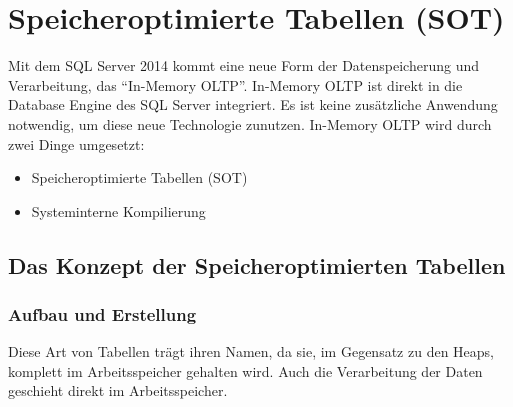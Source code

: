    \section{Speicheroptimierte Tabellen (SOT)}
      Mit dem SQL Server 2014 kommt eine neue Form der Datenspeicherung und
      Verarbeitung, das \enquote{In-Memory OLTP}. In-Memory OLTP ist direkt
      in die Database Engine des SQL Server integriert. Es ist keine
      zusätzliche Anwendung notwendig, um diese neue Technologie zunutzen.
      In-Memory OLTP wird durch zwei Dinge umgesetzt:
      \begin{itemize}
        \item Speicheroptimierte Tabellen (SOT)
        \item Systeminterne Kompilierung
      \end{itemize}
      \subsection{Das Konzept der Speicheroptimierten Tabellen}
        \subsubsection{Aufbau und Erstellung}
          Diese Art von Tabellen trägt ihren Namen, da sie, im Gegensatz zu den
          Heaps, komplett im Arbeitsspeicher gehalten wird. Auch die
          Verarbeitung der Daten geschieht direkt im Arbeitsspeicher. 

